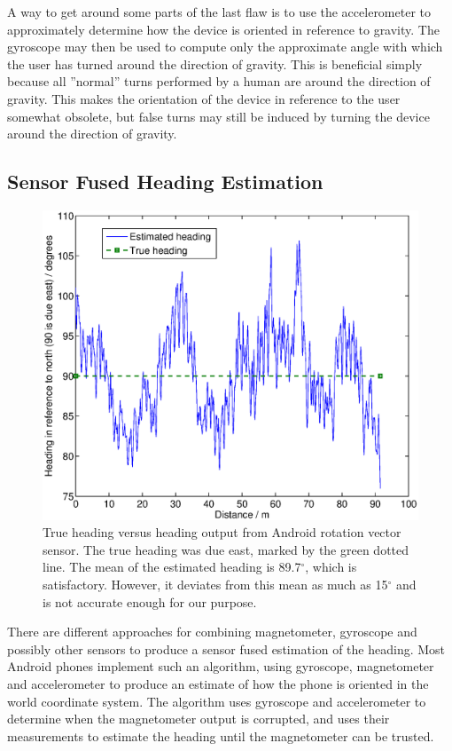 \documentclass{LTHthesis}
\begin{document}
A way to get around some parts of the last flaw is to use the accelerometer to approximately determine how the device is oriented in reference to gravity. The gyroscope may then be used to compute only the approximate angle with which the user has turned around the direction of gravity. This is beneficial simply because all ''normal'' turns performed by a human are around the direction of gravity. This makes the orientation of the device in reference to the user somewhat obsolete, but false turns may still be induced by turning the device around the direction of gravity.
% 
\subsection{Sensor Fused Heading Estimation}
%
\begin{figure}[!hbt]

\includegraphics[width=1\textwidth ]{images/kinematic/rot_test}
\caption{True heading versus heading output from Android rotation vector sensor. The true heading was due east, marked by the green dotted line. The mean of the estimated heading is 89.7$^\circ$, which is satisfactory. However, it deviates from this mean as much as 15$^\circ$ and is not accurate enough for our purpose.}\label{rot_test}
\end{figure}
%
There are different approaches for combining magnetometer, gyroscope and possibly other sensors to produce a sensor fused estimation of the heading. Most Android phones implement such an algorithm, using gyroscope, magnetometer and accelerometer to produce an estimate of how the phone is oriented in the world coordinate system. The algorithm uses gyroscope and accelerometer to determine when the magnetometer output is corrupted, and uses their measurements to estimate the heading until the magnetometer can be trusted. 
\end{document}
